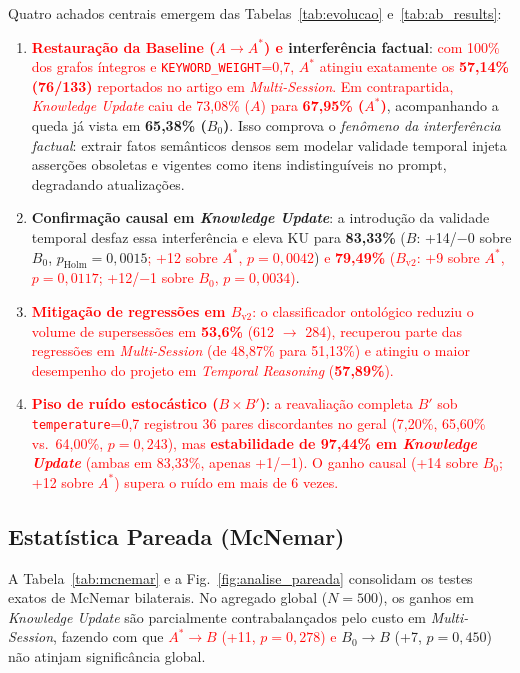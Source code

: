 \documentclass[10pt,conference,twocolumn]{IEEEtran}
\newcommand{\novo}[1]{\textcolor{red}{#1}}
\begin{document}
Quatro achados centrais emergem das Tabelas~\ref{tab:evolucao} e~\ref{tab:ab_results}:
\begin{enumerate}
    \item \textbf{\novo{Restauração da Baseline ($A \rightarrow A^*$) e} interferência factual}: \novo{com 100\% dos grafos íntegros e \texttt{KEYWORD\_WEIGHT}=0,7, $A^*$ atingiu exatamente os \textbf{57,14\% (76/133)} reportados no artigo em \textit{Multi-Session}. Em contrapartida, \textit{Knowledge Update} caiu de 73,08\% ($A$) para \textbf{67,95\% ($A^*$)}}, acompanhando a queda já vista em \textbf{65,38\% ($B_0$)}. Isso comprova o \textit{fenômeno da interferência factual}: extrair fatos semânticos densos sem modelar validade temporal injeta asserções obsoletas e vigentes como itens indistinguíveis no prompt, degradando atualizações.
    \item \textbf{Confirmação causal em \textit{Knowledge Update}}: a introdução da validade temporal desfaz essa interferência e eleva KU para \textbf{83,33\%} ($B$: +14/$-$0 sobre $B_0$, $p_{\text{Holm}} = 0{,}0015$\novo{; +12 sobre $A^*$, $p = 0{,}0042$}) \novo{e \textbf{79,49\%} ($B_{\text{v2}}$: +9 sobre $A^*$, $p = 0{,}0117$; +12/$-$1 sobre $B_0$, $p = 0{,}0034$)}.
    \item \novo{\textbf{Mitigação de regressões em $B_{\text{v2}}$}: o classificador ontológico reduziu o volume de supersessões em \textbf{53,6\%} (612 $\rightarrow$ 284), recuperou parte das regressões em \textit{Multi-Session} (de 48,87\% para 51,13\%) e atingiu o maior desempenho do projeto em \textit{Temporal Reasoning} (\textbf{57,89\%}).}
    \item \novo{\textbf{Piso de ruído estocástico ($B \times B'$)}}: \novo{a reavaliação completa $B'$ sob \texttt{temperature}=0,7 registrou 36 pares discordantes no geral (7,20\%, 65,60\% vs.\ 64,00\%, $p = 0{,}243$), mas \textbf{estabilidade de 97,44\% em \textit{Knowledge Update}} (ambas em 83,33\%, apenas +1/$-$1). O ganho causal (+14 sobre $B_0$; +12 sobre $A^*$) supera o ruído em mais de 6 vezes.}
\end{enumerate}

\subsection{Estatística Pareada (McNemar)}
A Tabela~\ref{tab:mcnemar} e a Fig.~\ref{fig:analise_pareada} consolidam os testes exatos de McNemar bilaterais. No agregado global ($N = 500$), os ganhos em \textit{Knowledge Update} são parcialmente contrabalançados pelo custo em \textit{Multi-Session}, fazendo com que \novo{$A^* \rightarrow B$ (+11, $p = 0{,}278$) e} $B_0 \rightarrow B$ (+7, $p = 0{,}450$) não atinjam significância global.
\end{document}
